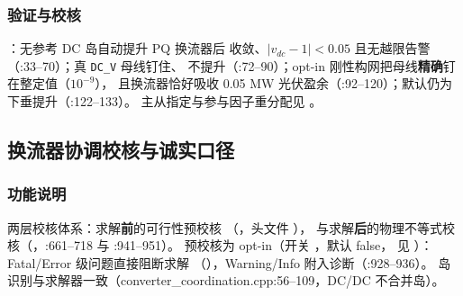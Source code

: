 \subsubsection*{验证与校核}
：无参考 DC 岛自动提升 PQ 换流器后
收敛、$|v_{dc}-1|<0.05$ 且无越限告警（:33--70）；真 \texttt{DC\_V} 母线钉住、
不提升（:72--90）；opt-in 刚性构网把母线\textbf{精确}钉在整定值（$10^{-9}$），
且换流器恰好吸收 0.05 MW 光伏盈余（:92--120）；默认仍为下垂提升（:122--133）。
主从指定与参与因子重分配见 。

\subsection{换流器协调校核与诚实口径}\label{sec:hybrid-coord}

\subsubsection*{功能说明}
两层校核体系：求解\textbf{前}的可行性预校核
（，头文件
），
与求解\textbf{后}的物理不等式校核（，:661--718 与 :941--951）。
预校核为 opt-in（开关 ，默认 false，
见 ）：Fatal/Error 级问题直接阻断求解
（），Warning/Info 附入诊断（:928--936）。
岛识别与求解器一致（converter\_coordination.cpp:56--109，DC/DC 不合并岛）。

